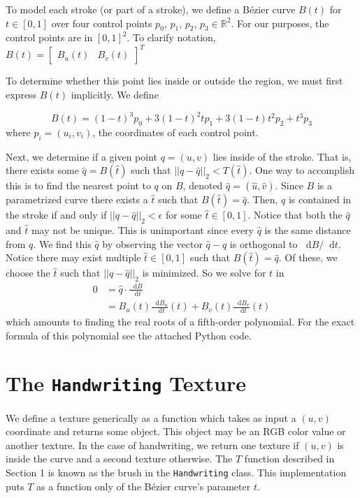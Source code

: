 \documentclass[12pt]{article}
\newcommand*\diff{\mathop{}\!\mathrm{d}}
\begin{document}
To model each stroke (or part of a stroke), we define a B\'ezier curve $B(t)$ for $t \in [0,1]$ over four control points $p_0$, $p_1$, $p_2$, $p_3 \in \mathbb{R}^2$. For our purposes, the control points are in $[0,1]^2$. To clarify notation, $B(t) = \begin{bmatrix} B_u(t) & B_v(t) \end{bmatrix}^T$

To determine whether this point lies inside or outside the region, we must first express $B(t)$ implicitly. We define

\[
	B(t) = (1 - t)^3 p_0 + 3(1 - t)^2 t p_1 + 3(1 - t)t^2 p_2 + t^3 p_3
\]
where $p_i = (u_i, v_i)$, the coordinates of each control point.

Next, we determine if a given point $q = (u,v)$ lies inside of the stroke. That is, there exists some $\hat{q} = B(\hat{t})$ such that $||q - \hat{q}||_2 < T(\hat{t})$. One way to accomplish this is to find the nearest point to $q$ on $B$, denoted $\hat{q} = (\hat{u}, \hat{v})$. Since $B$ is a parametrized curve there exists a $\hat{t}$ such that $B(\hat{t}) = \hat{q}$. Then, $q$ is contained in the stroke if and only if $||q - \hat{q}||_2 < \epsilon$ for some $\hat{t} \in [0,1]$. Notice that both the $\hat{q}$ and $\hat{t}$ may not be unique. This is unimportant since every $\hat{q}$ is the same distance from $q$. We find this $\hat{q}$ by observing the vector $\hat{q} - q$ is orthogonal to $\diff B / \diff t$. Notice there may exist multiple $\hat{t} \in [0,1]$ such that $B(\hat{t}) = \hat{q}$. Of these, we choose the $\hat{t}$ such that $||q - \hat{q}||_2$ is minimized. So we solve for $t$ in
\begin{align*}
 0 &= \hat{q} \cdot \frac{\diff B}{\diff t} \\
  &= B_u(t)\frac{\diff B_u}{\diff t}(t) + B_v(t)\frac{\diff B_v}{\diff t}(t)
\end{align*}
which amounts to finding the real roots of a fifth-order polynomial. For the exact formula of this polynomial see the attached Python code.

\section{The \texttt{Handwriting} Texture}
We define a texture generically as a function which takes as input a $(u,v)$ coordinate and returns some object. This object may be an RGB color value or another texture. In the case of handwriting, we return one texture if $(u,v)$ is inside the curve and a second texture otherwise. The $T$ function described in Section 1 is known as the brush in the \texttt{Handwriting} class. This implementation puts $T$ as a function only of the B\'ezier curve's parameter $t$.
\end{document}
